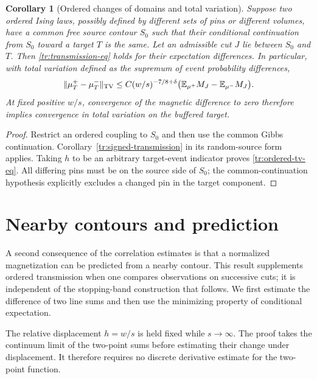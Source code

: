 \documentclass[11pt]{article}
\newtheorem{corollary}[theorem]{Corollary}
\theoremstyle{definition}
\theoremstyle{remark}
\numberwithin{equation}{section}
\begin{document}
\begin{corollary}[Ordered changes of domains and total variation]
\label{tr:ordered-tv}
Suppose two ordered Ising laws, possibly defined by different sets of
pins or different volumes, have a common free source contour $S_0$ such
that their conditional continuation from $S_0$ toward a target $T$ is the
same. Let an admissible cut $J$ lie between $S_0$ and $T$. Then
\eqref{tr:transmission-eq} holds for their expectation differences.
In particular, with total variation defined as the supremum of event
probability differences,
\begin{equation}
\label{tr:ordered-tv-eq}
 \|\mu_T^+-\mu_T^-\|_{\rm TV}
 \leq C(w/s)^{-7/8+\delta}
       \bigl(\mathbb E_{\mu^+}M_J-\mathbb E_{\mu^-}M_J\bigr).
\end{equation}
At fixed positive $w/s$, convergence of the magnetic difference to zero
therefore implies convergence in total variation on the buffered target.
\end{corollary}

\begin{proof}
Restrict an ordered coupling to $S_0$ and then use the common Gibbs
continuation. Corollary~\ref{tr:signed-transmission} in its random-source
form applies. Taking $h$ to be an arbitrary target-event indicator proves
\eqref{tr:ordered-tv-eq}. All differing pins must be on the source side of
$S_0$; the common-continuation hypothesis explicitly excludes a changed
pin in the target component.
\end{proof}


\section{Nearby contours and prediction}\label{li:section}


A second consequence of the correlation estimates is that a normalized
magnetization can be predicted from a nearby contour. This result
supplements ordered transmission when one compares observations on
successive cuts; it is independent of the stopping-band construction
that follows. We first estimate the difference of two line sums and
then use the minimizing property of conditional expectation.

The relative displacement $h=w/s$ is held fixed while $s\to\infty$.
The proof takes the continuum limit of the two-point sums before
estimating their change under displacement. It therefore requires no
discrete derivative estimate for the two-point function.
\end{document}
